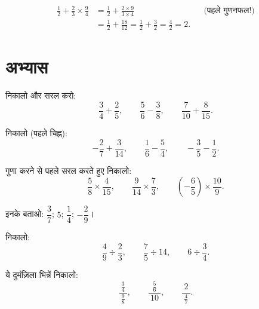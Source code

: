 \begin{example}\label{ex:g8:fractions:mixed}
\begin{align*}
\frac12 + \frac{2}{3} \times \frac{9}{4}
&= \frac12 + \frac{2 \times 9}{3 \times 4}
&& \text{(पहले गुणनफल!)} \\
&= \frac12 + \frac{18}{12} = \frac12 + \frac32
= \frac{4}{2} = 2 .
\end{align*}
\end{example}

\section{अभ्यास}

\begin{exercise}[$\star$]\label{exo:g8:fractions:1}
निकालो और सरल करो:
\[
\frac{3}{4} + \frac{2}{5}, \qquad
\frac{5}{6} - \frac{3}{8}, \qquad
\frac{7}{10} + \frac{8}{15} .
\]
\end{exercise}

\begin{exercise}[$\star$]\label{exo:g8:fractions:2}
निकालो (पहले चिह्न):
\[
-\frac{2}{7} + \frac{3}{14}, \qquad
\frac{1}{6} - \frac{5}{4}, \qquad
-\frac{3}{5} - \frac{1}{2} .
\]
\end{exercise}

\begin{exercise}[$\star$]\label{exo:g8:fractions:3}
गुणा करने से पहले सरल करते हुए निकालो:
\[
\frac{5}{8} \times \frac{4}{15}, \qquad
\frac{9}{14} \times \frac{7}{3}, \qquad
\left(-\frac{6}{5}\right) \times \frac{10}{9} .
\]
\end{exercise}

\begin{exercise}[$\star$]\label{exo:g8:fractions:4}
इनके  बताओ: $\dfrac{3}{7}$; \quad $5$; \quad
$\dfrac{1}{4}$; \quad $-\dfrac{2}{9}$।
\end{exercise}

\begin{exercise}[$\star$]\label{exo:g8:fractions:5}
निकालो:
\[
\frac{4}{9} \div \frac{2}{3}, \qquad
\frac{7}{5} \div 14, \qquad
6 \div \frac{3}{4} .
\]
\end{exercise}

\begin{exercise}[$\star$]\label{exo:g8:fractions:6}
ये दुमंज़िला भिन्नें निकालो:
\[
\frac{\ \frac{3}{4}\ }{\ \frac{9}{8}\ },
\qquad
\frac{\ \frac{5}{6}\ }{\ 10\ },
\qquad
\frac{\ 2\ }{\ \frac{4}{7}\ } .
\]
\end{exercise}


